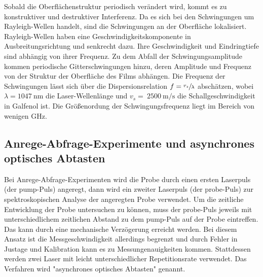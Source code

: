 Sobald die Oberflächenstruktur periodisch verändert wird, kommt es zu konstruktiver und destruktiver Interferenz. Da es sich bei den Schwingungen um Rayleigh-Wellen handelt, sind die Schwingungen an der Oberfläche lokalisiert. Rayleigh-Wellen haben eine Geschwindigkeitskomponente in Ausbreitungsrichtung und senkrecht dazu. Ihre Geschwindigkeit und Eindringtiefe sind abhängig von ihrer Frequenz. Zu dem Abfall der Schwingungsamplitude kommen periodische Gitterschwingungen hinzu, deren Amplitude und Frequenz von der Struktur der Oberfläche des Films abhängen. Die Frequenz der Schwingungen lässt sich über die Dispersionsrelation $f = \sfrac{v_s}{\lambda}$ abschätzen, wobei $\lambda = \SI{1047}{\nano\metre}$ die Laser-Wellenlänge und $v_s = ~ \SI{2500}{\metre\per\second}$ die Schallgeschwindigkeit in Galfenol \cite{galfenol} ist. Die Größenordung der Schwingungsfrequenz liegt im Bereich von wenigen GHz.

\subsection{Anrege-Abfrage-Experimente und asynchrones optisches Abtasten}

Bei Anrege-Abfrage-Experimenten wird die Probe durch einen ersten Laserpuls (der pump-Puls) angeregt, dann wird ein zweiter Laserpuls (der probe-Puls) zur spektroskopischen Analyse der angeregten Probe verwendet. Um die zeitliche Entwicklung der Probe untersuchen zu können, muss der probe-Puls jeweils mit unterschiedlichem zeitlichen Abstand zu dem pump-Puls auf der Probe eintreffen. Das kann durch eine mechanische Verzögerung erreicht werden. Bei diesem Ansatz ist die Messgeschwindigkeit allerdings begrenzt und durch Fehler in Justage und Kalibration kann es zu Messungenauigkeiten kommen. Stattdessen werden zwei Laser mit leicht unterschiedlicher Repetitionsrate verwendet. Das Verfahren wird "asynchrones optisches Abtasten" genannt.
